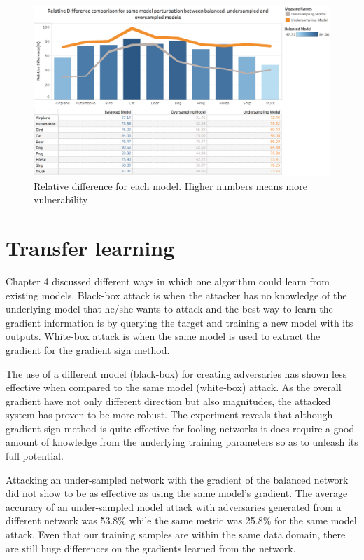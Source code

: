 \begin{figure}
	\centering
	\includegraphics[scale=0.3]{rel_diff_graph.png}
	\caption{Relative difference for each model. Higher numbers means more vulnerability}
	\label{fig:relative_difference}
\end{figure}

\section{Transfer learning}

Chapter 4 discussed different ways in which one algorithm could learn from existing models. Black-box attack is when the attacker has no knowledge of the underlying model that he/she wants to attack and the best way to learn the gradient information is by querying the target and training a new model with its outputs. White-box attack is when the same model is used to extract the gradient for the gradient sign method.

The use of a different model (black-box) for creating adversaries has shown less effective when compared to the same model (white-box) attack. As the overall gradient have not only different direction but also magnitudes, the attacked system has proven to be more robust. The experiment reveals that although gradient sign method is quite effective for fooling networks it does require a good amount of knowledge from the underlying training parameters so as to unleash its full potential.

Attacking an under-sampled network with the gradient of the balanced network did not show to be as effective as using the same model's gradient. The average accuracy of an under-sampled model attack with adversaries generated from a different network was 53.8\% while the same metric was 25.8\% for the same model attack. Even that our training samples are within the same data domain, there are still huge differences on the gradients learned from the network. 

